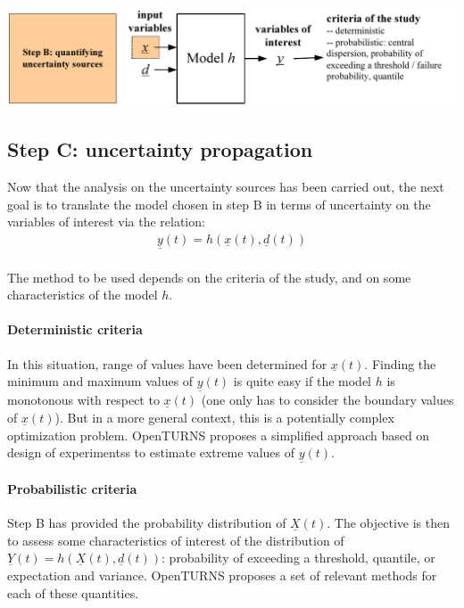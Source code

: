 \begin{center}
  \includegraphics[scale=0.8]{Figures/flow3.pdf}
\end{center}



\subsection{Step C: uncertainty propagation}

Now that the analysis on the uncertainty sources has been carried out, the next goal is to translate the model chosen in step B in terms of uncertainty on the variables of interest via the relation:
\begin{align*}
  \underline{y}(t) = h \left( \underline{x}(t),\underline{d}(t) \right)
\end{align*}
\\

The method to be used depends on the criteria of the study, and on some characteristics of the model $h$.

\paragraph{Deterministic criteria}
\par

In this situation, range of values have been determined for $\underline{x}(t)$. Finding the minimum and maximum values of $\underline{y}(t)$ is quite easy if the model $h$ is monotonous with respect to $\underline{x}(t)$ (one only has to consider the boundary values of $\underline{x}(t)$). But in a more general context, this is a potentially complex optimization problem. OpenTURNS proposes a simplified approach based on design of experimentss to estimate extreme values of $\underline{y}(t)$.

\paragraph{Probabilistic criteria}
\par

Step B has provided the probability distribution of $\underline{X}(t)$. The objective is then to assess some characteristics of interest of the distribution of $\underline{Y}(t) = h \left( \underline{X}(t),\underline{d}(t) \right)$: probability of exceeding a threshold, quantile, or expectation and variance. OpenTURNS proposes a set of relevant methods for each of these quantities.

